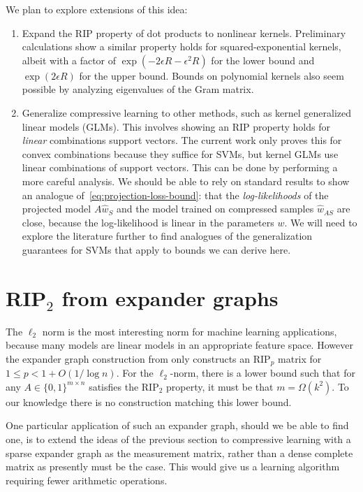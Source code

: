 \documentclass[english]{article}
\begin{document}
We plan to explore extensions of this idea:
\begin{enumerate}
\item Expand the RIP property of dot products to nonlinear kernels. Preliminary calculations show a similar property holds for squared-exponential kernels, albeit with a factor of $\exp(-2\epsilon R - \epsilon^2 R)$ for the lower bound and $\exp(2 \epsilon R)$ for the upper bound. Bounds on polynomial kernels also seem possible by analyzing eigenvalues of the Gram matrix.
\item Generalize compressive learning to other methods, such as kernel generalized linear models (GLMs). This involves showing an RIP property holds for \emph{linear} combinations support vectors. The current work only proves this for convex combinations because they suffice for SVMs, but kernel GLMs use linear combinations of support vectors. This can be done by performing a more careful analysis. We should be able to rely on standard results to show an analogue of~\eqref{eq:projection-loss-bound}: that the \emph{log-likelihoods} of the projected  model $A\widehat{w}_S$ and the model trained on compressed samples $\widehat{w}_{AS}$ are close, because the log-likelihood is linear in the parameters $w$. We will need to explore the literature further to find analogues of the generalization guarantees for SVMs that apply to bounds we can derive here.
\end{enumerate}

\section{RIP$_2$ from expander graphs}

The $\ell_2$ norm is the most interesting norm for machine learning applications, because many models are linear models in an appropriate feature space. However the expander graph construction from \citet{Berinde2008} only constructs an RIP$_p$ matrix for $1 \le p < 1+O(1/\log n)$. For the $\ell_2$-norm, there is a lower bound such that for any $A \in \{0,1\}^{m\times n}$ satisfies the RIP$_2$ property, it must be that $m = \Omega(k^2)$. To our knowledge there is no construction matching this lower bound. 

One particular application of such an expander graph, should we be able to find one, is to extend the ideas of the previous section to compressive learning with a sparse expander graph as the measurement matrix, rather than a dense complete matrix as presently must be the case. This would give us a learning algorithm requiring fewer arithmetic operations.
\end{document}
